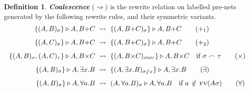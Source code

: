 \documentclass{article}
\theoremstyle{definition}
\newtheorem{definition}{Definition}
\theoremstyle{plain}
\newcommand\defn[1]{\textit{\textbf{#1}}}
\newcommand\+{+}
\renewcommand\*{\times}
\newcommand\fv{\textsc{fv}}
\newcommand\net[3]{#1\triangleright #2,#3}
\newcommand\join\bowtie
\newcommand\comp\frown
\newcommand\clink[3][\sigma]{(#2,#3)_{#1}}
\newcommand\minus{\mathop{/\mathchoice{\kern-3pt}{\kern-3pt}{\kern-2.5pt}{\kern-2pt}/}}
\newcommand\coals{\rightsquigarrow}
\newcommand\coal{\coals}%
\begin{document}

\begin{definition}
\defn{Coalescence} ($\coals$) is the rewrite relation on labelled pre-nets generated by the following rewrite rules, and their symmetric variants.
%
\renewcommand{\+}{{+}}
\renewcommand{\*}{{\times}}
\begin{align}
  	\net{\{\clink AB\}}A{B\+C} 
& ~\coal~
	\net{\{\clink A{B\+C}\}}A{B\+C}
\tag{$\+_1$}
\\[5pt]
        \net{\{\clink AC\}}A{B\+C}
& ~\coal~  
	\net{\{\clink A{B\+C}\}}A{B\+C}
\tag{$\+_2$}
\\[5pt]
	\net{\{\clink AB,\clink[\tau]AC\}}A{B\*C}
& ~\coal~ 
	\net{\{\clink[\sigma\join\tau]A{B\*C}\}}A{B\*C}\quad\text{if }\sigma\comp\tau
\tag{$\*$}
\\[5pt]	
	\net{\{\clink AB\}}A{\exists x.B}
& ~\coal~ 
	\net{\{\clink[\sigma\!\minus\!x]A{\exists x.B}\}}A{\exists x.B}
\tag{$\exists$}
\\[5pt]
	\net{\{\clink AB\}}A{\forall a.B}
& ~\coal~ 
	\net{\clink A{\forall a.B}}A{\forall a.B} \quad \text{if }a\,\notin\,\fv(A\sigma)
\tag{$\forall$}
\end{align}

\end{definition}
\end{document}
